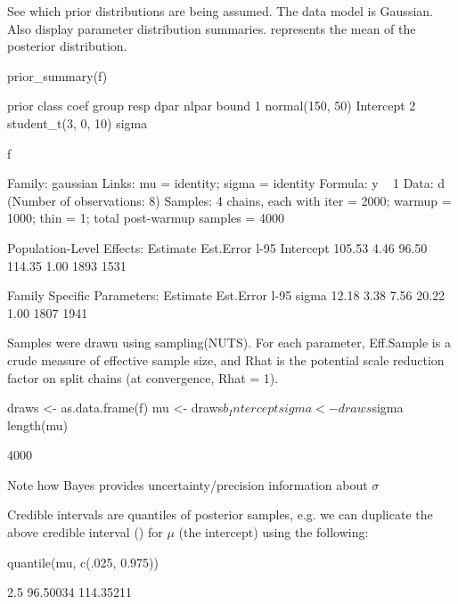 See which prior distributions are being assumed.  The data model is
Gaussian.  Also display parameter distribution summaries.
 represents the mean of the posterior distribution.
\begin{Schunk}
\begin{Sinput}
prior_summary(f)
\end{Sinput}
\begin{Soutput}
                prior     class coef group resp dpar nlpar bound
1     normal(150, 50) Intercept                                 
2 student_t(3, 0, 10)     sigma                                 
\end{Soutput}
\begin{Sinput}
f
\end{Sinput}
\begin{Soutput}
 Family: gaussian 
  Links: mu = identity; sigma = identity 
Formula: y ~ 1 
   Data: d (Number of observations: 8) 
Samples: 4 chains, each with iter = 2000; warmup = 1000; thin = 1;
         total post-warmup samples = 4000

Population-Level Effects: 
          Estimate Est.Error l-95%
Intercept   105.53      4.46    96.50   114.35 1.00     1893     1531

Family Specific Parameters: 
      Estimate Est.Error l-95%
sigma    12.18      3.38     7.56    20.22 1.00     1807     1941

Samples were drawn using sampling(NUTS). For each parameter, Eff.Sample 
is a crude measure of effective sample size, and Rhat is the potential 
scale reduction factor on split chains (at convergence, Rhat = 1).
\end{Soutput}
\begin{Sinput}
draws <- as.data.frame(f)
mu    <- draws$b_Intercept
sigma <- draws$sigma
length(mu)
\end{Sinput}
\begin{Soutput}
[1] 4000
\end{Soutput}
\end{Schunk}
\bi
\item Note how Bayes provides uncertainty/precision information about $\sigma$
\item Credible intervals are quantiles of posterior samples, e.g. we
  can duplicate the above credible interval () for $\mu$ (the intercept) using the following:
\begin{Schunk}
\begin{Sinput}
quantile(mu, c(.025, 0.975))
\end{Sinput}
\begin{Soutput}
     2.5%
 96.50034 114.35211 
\end{Soutput}
\end{Schunk}
